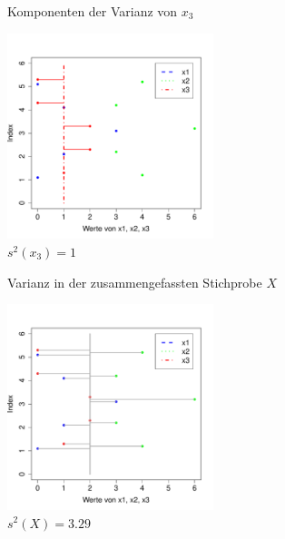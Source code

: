 \begin{frame}
  {Komponenten der Varianz von $x_3$}
  
  \begin{center}
    \includegraphics[width=0.45\textwidth]{graphics/anova_var_x3}\\
    $s^2(x_3)=1$
  \end{center}
\end{frame}

\begin{frame}
  {Varianz in der zusammengefassten Stichprobe $X$}
  
  \begin{center}
    \includegraphics[width=0.45\textwidth]{graphics/anova_var_total}\\
    $s^2(X)=3.29$
  \end{center}
\end{frame}

